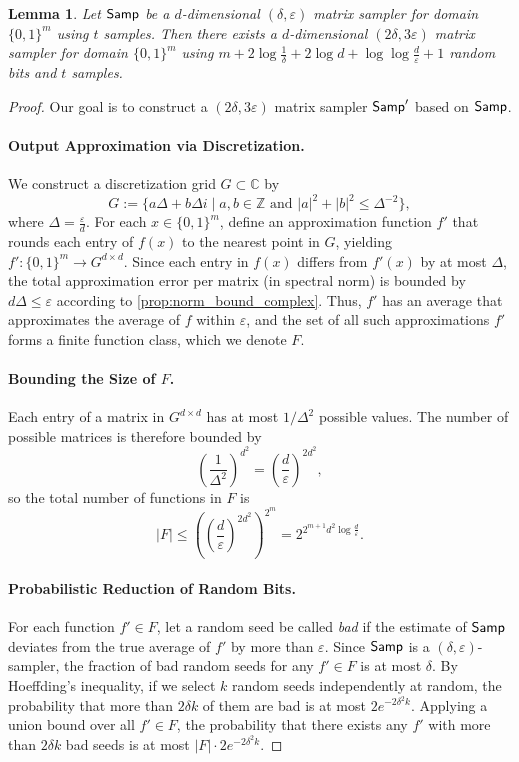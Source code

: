 \documentclass[11pt,letterpaper]{article}
\newtheorem{lemma}[theorem]{Lemma}
\newcommand{\Z}{\mathbb{Z}}
\newcommand{\eps}{\varepsilon}
\newcommand{\1}{\mathbbm{1}}
\newcommand{\abs}[1]{\left|#1\right| }
\newcommand{\tuple}[1]{\left(#1\right)}
\newcommand{\zo}{\{0, 1\}}
\newcommand{\Smp}{\textup{\textsf{Samp}}}
\begin{document}
\begin{lemma}
    \label{lem:non_explicit_reduction}
    Let $\Smp$ be a $d$-dimensional $(\delta, \eps)$ matrix sampler for domain $\zo^m$ using $t$ samples. Then there exists a $d$-dimensional $(2\delta, 3\eps)$ matrix sampler for domain $\zo^m$ using $m + 2 \log \frac{1}{\delta} + 2 \log d + \log \log \frac{d}{\eps} + 1$ random bits and $t$ samples.
\end{lemma}
\begin{proof}
Our goal is to construct a $(2\delta, 3\eps)$ matrix sampler $\Smp'$ based on $\Smp$.
\paragraph{Output Approximation via Discretization.} 

We construct a discretization grid \( G \subset \mathbb{C} \) by \[
    G := \{a\Delta + b\Delta i \mid a, b \in \Z \text{ and } \abs{a}^2 + \abs{b}^2 \le \Delta^{-2}\},
\]
where $\Delta = \frac{\eps}{d}$.
For each \( x \in \{0,1\}^m \), define an approximation function \( f' \) that rounds each entry of \( f(x) \) to the nearest point in \( G \), yielding \( f' : \{0,1\}^m \to G^{d \times d} \). Since each entry in \( f(x) \) differs from \( f'(x) \) by at most \( \Delta \), the total approximation error per matrix (in spectral norm) is bounded by \( d\Delta \le \eps\) according to \cref{prop:norm_bound_complex}. Thus, \( f' \) has an average that approximates the average of \( f \) within \( \eps \), and the set of all such approximations \( f' \) forms a finite function class, which we denote \( F \).


\paragraph{Bounding the Size of \( F \).}
Each entry of a matrix in \( G^{d \times d} \) has at most \(1 / \Delta^2\)
possible values. The number of possible matrices is therefore bounded by
\[
\left( \frac{1}{\Delta^2} \right)^{d^2} = \tuple{\frac{d}{\eps}}^{2d^2},
\] 
so the total number of functions in \( F \) is 
\[
\abs{F} \le \left( \tuple{\frac{d}{\eps}}^{2d^2} \right)^{2^m} = 2^{2^{m+1}d^2\log\frac{d}{\eps}}.
\]

\paragraph{Probabilistic Reduction of Random Bits.}
For each function \( f' \in F \), let a random seed be called \textit{bad} if the estimate of \( \Smp \) deviates from the true average of \( f' \) by more than \( \eps \). Since \( \Smp \) is a \( (\delta, \eps) \)-sampler, the fraction of bad random seeds for any \( f' \in F \) is at most \( \delta \). By Hoeffding's inequality, if we select \( k \) random seeds independently at random, the probability that more than \( 2\delta k \) of them are bad is at most $
2e^{-2\delta^2 k}$.
Applying a union bound over all \( f' \in F \), the probability that there exists any \( f' \) with more than \( 2\delta k \) bad seeds is at most \( \abs{F} \cdot 2 e^{-2\delta^2 k} \).


\end{proof}
\end{document}
